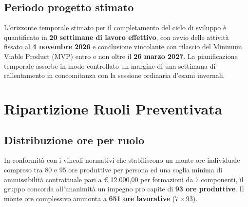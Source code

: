 \documentclass[12pt,a4paper]{article}
\begin{document}
\hypertarget{periodo-progetto-stimato}{%
\subsection{Periodo progetto stimato}}
L'orizzonte temporale stimato per il completamento del ciclo di sviluppo è quantificato in \textbf{20 settimane di lavoro effettivo}, con avvio delle attività fissato al \textbf{4 novembre 2026} e conclusione vincolante con rilascio del Minimum Viable Product (MVP) entro e non oltre il \textbf{26 marzo 2027}. La pianificazione temporale assorbe in modo controllato un margine di una settimana di rallentamento in concomitanza con la sessione ordinaria d'esami invernali.

\hypertarget{ripartizione-ruoli-preventivata}{%
\section{Ripartizione Ruoli Preventivata}}

\hypertarget{distribuzione-ore-per-ruolo}{%
\subsection{Distribuzione ore per ruolo}}
In conformità con i vincoli normativi che stabiliscono un monte ore individuale compreso tra 80 e 95 ore produttive per persona ed una soglia minima di ammissibilità contrattuale pari a € 12.000,00 per formazioni da 7 componenti, il gruppo concorda all'unanimità un impegno pro capite di \textbf{93 ore produttive}. Il monte ore complessivo ammonta a \textbf{651 ore lavorative} ($7 \times 93$).
\end{document}
